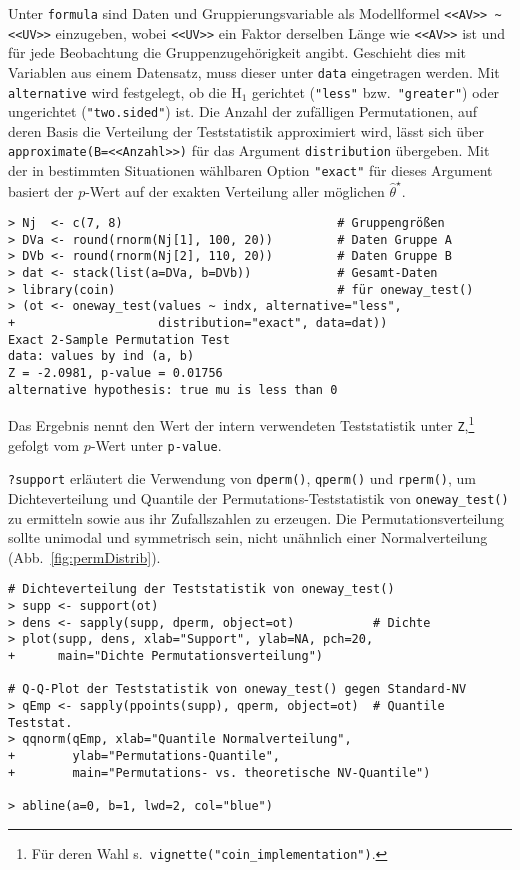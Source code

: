 Unter \lstinline!formula! sind Daten und Gruppierungsvariable als Modellformel \lstinline!<<AV>> ~ <<UV>>! einzugeben, wobei \lstinline!<<UV>>! ein Faktor derselben Länge wie \lstinline!<<AV>>! ist und für jede Beobachtung die Gruppenzugehörigkeit angibt. Geschieht dies mit Variablen aus einem Datensatz, muss dieser unter \lstinline!data! eingetragen werden. Mit \lstinline!alternative! wird festgelegt, ob die $\text{H}_{1}$ gerichtet (\lstinline!"less"! bzw.\ \lstinline!"greater"!) oder ungerichtet (\lstinline!"two.sided"!) ist. Die Anzahl der zufälligen Permutationen, auf deren Basis die Verteilung der Teststatistik approximiert wird, lässt sich über \lstinline!approximate(B=<<Anzahl>>)! für das Argument \lstinline!distribution! übergeben. Mit der in bestimmten Situationen wählbaren Option \lstinline!"exact"! für dieses Argument basiert der $p$-Wert auf der exakten Verteilung aller möglichen $\hat{\theta}^{\star}$.
\begin{lstlisting}
> Nj  <- c(7, 8)                              # Gruppengrößen
> DVa <- round(rnorm(Nj[1], 100, 20))         # Daten Gruppe A
> DVb <- round(rnorm(Nj[2], 110, 20))         # Daten Gruppe B
> dat <- stack(list(a=DVa, b=DVb))            # Gesamt-Daten
> library(coin)                               # für oneway_test()
> (ot <- oneway_test(values ~ indx, alternative="less",
+                    distribution="exact", data=dat))
Exact 2-Sample Permutation Test
data: values by ind (a, b)
Z = -2.0981, p-value = 0.01756
alternative hypothesis: true mu is less than 0
\end{lstlisting}

Das Ergebnis nennt den Wert der intern verwendeten Teststatistik unter \lstinline!Z!,\footnote{Für deren Wahl s.\ \lstinline!vignette("coin_implementation")!.} gefolgt vom $p$-Wert unter \lstinline!p-value!.

\lstinline!?support! erläutert die Verwendung von \lstinline!dperm()!, \lstinline!qperm()! und \lstinline!rperm()!, um Dichteverteilung und Quantile der Permutations-Teststatistik von \lstinline!oneway_test()! zu ermitteln sowie aus ihr Zufallszahlen zu erzeugen. Die Permutationsverteilung sollte unimodal und symmetrisch sein, nicht unähnlich einer Normalverteilung (Abb.\ \ref{fig:permDistrib}).
\begin{lstlisting}
# Dichteverteilung der Teststatistik von oneway_test()
> supp <- support(ot)
> dens <- sapply(supp, dperm, object=ot)           # Dichte
> plot(supp, dens, xlab="Support", ylab=NA, pch=20,
+      main="Dichte Permutationsverteilung")

# Q-Q-Plot der Teststatistik von oneway_test() gegen Standard-NV
> qEmp <- sapply(ppoints(supp), qperm, object=ot)  # Quantile Teststat.
> qqnorm(qEmp, xlab="Quantile Normalverteilung",
+        ylab="Permutations-Quantile",
+        main="Permutations- vs. theoretische NV-Quantile")

> abline(a=0, b=1, lwd=2, col="blue")
\end{lstlisting}

